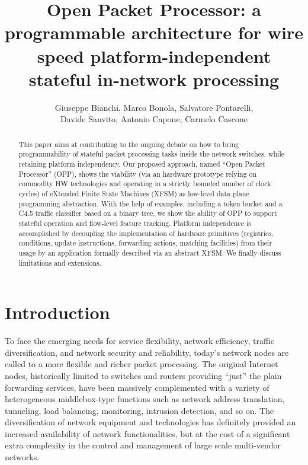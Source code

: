 \documentclass{sig-alternate}
\begin{document}
\title{Open Packet Processor: a programmable architecture for wire speed platform-independent stateful in-network processing}

\author{
Giuseppe Bianchi, Marco Bonola, Salvatore Pontarelli,\\Davide Sanvito, Antonio Capone, Carmelo Cascone\\
}

\maketitle


\begin{abstract}
This paper aims at contributing to the ongoing debate on how to bring programmability of stateful packet processing tasks inside the network switches, while retaining platform independency. Our proposed approach, named ``Open Packet Processor'' (OPP), shows the viability (via an hardware prototype relying on commodity HW technologies and operating in a strictly bounded number of clock cycles) of eXtended Finite State Machines (XFSM) as low-level data plane programming abstraction. With the help of examples, including a token bucket and a C4.5  traffic classifier based on a binary tree, we show the ability of OPP  to support stateful operation and flow-level feature tracking. Platform independence is accomplished by decoupling the implementation of hardware primitives (registries, conditions, update instructions, forwarding actions, matching facilities) from their usage by an application formally described via an abstract XFSM. We finally discuss limitations and extensions.
\end{abstract}



\section{Introduction}
\label{s:intro}
To face the emerging needs for service flexibility, network efficiency, traffic diversification, and network security and reliability, today's network nodes are called to a more flexible and richer packet processing. The original Internet nodes, historically limited to switches and routers providing ``just'' the plain forwarding services, have been massively complemented with a variety of heterogeneous middlebox-type functions \cite{Wan11,She12,Qaz13,Gem14} such as network address translation, tunneling, load balancing, monitoring, intrusion detection, and so on. The diversification of network equipment and technologies has definitely provided an increased availability of network functionalities, but at the cost of a significant extra complexity in the control and management of large scale multi-vendor networks.
\end{document}
